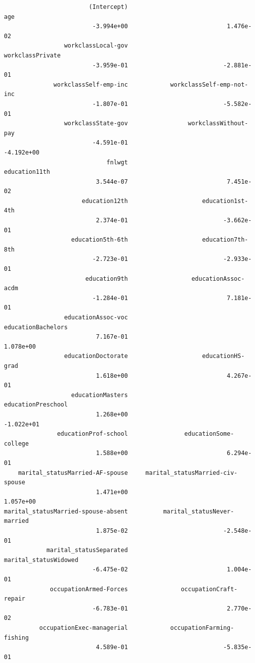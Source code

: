 \documentclass[12pt]{article}
\begin{document}
\begin{enumerate}[(a)]
\begin{Verbatim}
                        (Intercept)                                  age  
                         -3.994e+00                            1.476e-02  
                 workclassLocal-gov                     workclassPrivate  
                         -3.959e-01                           -2.881e-01  
              workclassSelf-emp-inc            workclassSelf-emp-not-inc  
                         -1.807e-01                           -5.582e-01  
                 workclassState-gov                 workclassWithout-pay  
                         -4.591e-01                           -4.192e+00  
                             fnlwgt                        education11th  
                          3.544e-07                            7.451e-02  
                      education12th                     education1st-4th  
                          2.374e-01                           -3.662e-01  
                   education5th-6th                     education7th-8th  
                         -2.723e-01                           -2.933e-01  
                       education9th                  educationAssoc-acdm  
                         -1.284e-01                            7.181e-01  
                 educationAssoc-voc                   educationBachelors  
                          7.167e-01                            1.078e+00  
                 educationDoctorate                     educationHS-grad  
                          1.618e+00                            4.267e-01  
                   educationMasters                   educationPreschool  
                          1.268e+00                           -1.022e+01  
               educationProf-school                educationSome-college  
                          1.588e+00                            6.294e-01  
    marital_statusMarried-AF-spouse     marital_statusMarried-civ-spouse  
                          1.471e+00                            1.057e+00  
marital_statusMarried-spouse-absent          marital_statusNever-married  
                          1.875e-02                           -2.548e-01  
            marital_statusSeparated                marital_statusWidowed  
                         -6.475e-02                            1.004e-01  
             occupationArmed-Forces               occupationCraft-repair  
                         -6.783e-01                            2.770e-02  
          occupationExec-managerial            occupationFarming-fishing  
                          4.589e-01                           -5.835e-01  

\end{Verbatim}
\end{enumerate}
\end{document}
